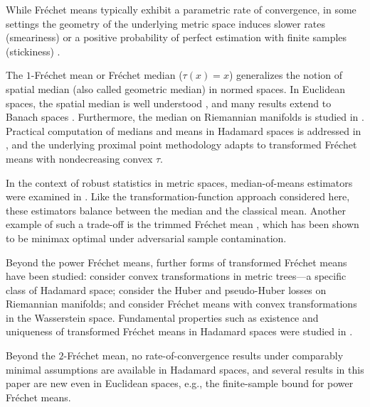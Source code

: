 \documentclass{article}
\newcommand{\tran}{\tau}
\begin{document}
While Fr\'echet means typically exhibit a parametric rate of convergence, in some settings the geometry of the underlying metric space induces slower rates (smeariness) \cite{eltzner19} or a positive probability of perfect estimation with finite samples (stickiness) \cite{Lammers2023}.

The $1$-Fr\'echet mean or Fr\'echet median ($\tran(x)=x$) generalizes the notion of spatial median (also called geometric median) in normed spaces. In Euclidean spaces, the spatial median is well understood \cite{mottonen10,Minsker2024}, and many results extend to Banach spaces \cite{Kemperman1987,Chakraborty2014,minsker15,romon2023quantiles}. Furthermore, the median on Riemannian manifolds is studied in \cite{yang10}. Practical computation of medians and means in Hadamard spaces is addressed in \cite{Bacak2014}, and the underlying proximal point methodology \cite{Bacak2013} adapts to transformed Fr\'echet means with nondecreasing convex $\tran$.

In the context of robust statistics in metric spaces, median-of-means estimators were examined in \cite{Yun2023,kim2025}. Like the transformation-function approach considered here, these estimators balance between the median and the classical mean. Another example of such a trade-off is the trimmed Fr\'echet mean \cite{oliveira2025,bartl2025}, which has been shown to be minimax optimal under adversarial sample contamination.

Beyond the power Fr\'echet means, further forms of transformed Fr\'echet means have been studied: \cite{romon2023convex} consider convex transformations in metric trees---a specific class of Hadamard space; \cite{lee2025} consider the Huber and pseudo-Huber losses on Riemannian manifolds; and \cite{Brizzi2026} consider Fr\'echet means with convex transformations in the Wasserstein space. Fundamental properties such as existence and uniqueness of transformed Fr\'echet means in Hadamard spaces were studied in \cite{varinequ}.

Beyond the $2$-Fr\'echet mean, no rate-of-convergence results under comparably minimal assumptions are available in Hadamard spaces, and several results in this paper are new even in Euclidean spaces, e.g., the finite-sample bound for power Fr\'echet means.
%
%
%
\end{document}
